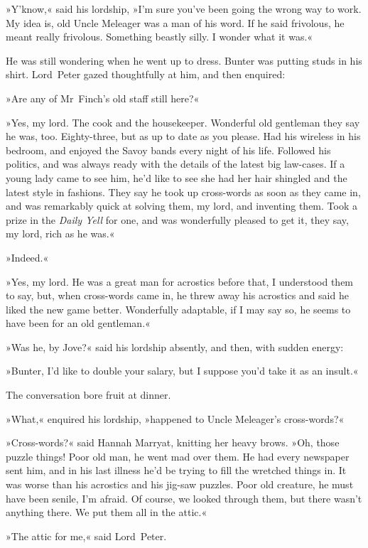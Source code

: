 »Y'know,« said his lordship, »I'm sure you've been going the wrong way to work. My idea is, old Uncle Meleager was a man of his word. If he said frivolous, he meant really frivolous. Something beastly silly. I wonder what it was.«

He was still wondering when he went up to dress. Bunter was putting studs in his shirt. Lord~Peter gazed thoughtfully at him, and then enquired:

»Are any of Mr~Finch's old staff still here?«

»Yes, my lord. The cook and the housekeeper. Wonderful old gentleman they say he was, too. Eighty-three, but as up to date as you please. Had his wireless in his bedroom, and enjoyed the Savoy bands every night of his life. Followed his politics, and was always ready with the details of the latest big law-cases. If a young lady came to see him, he'd like to see she had her hair shingled and the latest style in fashions. They say he took up cross-words as soon as they came in, and was remarkably quick at solving them, my lord, and inventing them. Took a  prize in the \textit{Daily Yell} for one, and was wonderfully pleased to get it, they say, my lord, rich as he was.«

»Indeed.«

»Yes, my lord. He was a great man for acrostics before that, I understood them to say, but, when cross-words came in, he threw away his acrostics and said he liked the new game better. Wonderfully adaptable, if I may say so, he seems to have been for an old gentleman.«

»Was he, by Jove?« said his lordship absently, and then, with sudden energy:

»Bunter, I'd like to double your salary, but I suppose you'd take it as an insult.«

The conversation bore fruit at dinner.

»What,« enquired his lordship, »happened to Uncle Meleager's cross-words?«

»Cross-words?« said Hannah Marryat, knitting her heavy brows. »Oh, those puzzle things! Poor old man, he went mad over them. He had every newspaper sent him, and in his last illness he'd be trying to fill the wretched things in. It was worse than his acrostics and his jig-saw puzzles. Poor old creature, he must have been senile, I'm afraid. Of course, we looked through them, but there wasn't anything there. We put them all in the attic.«

»The attic for me,« said Lord~Peter.

